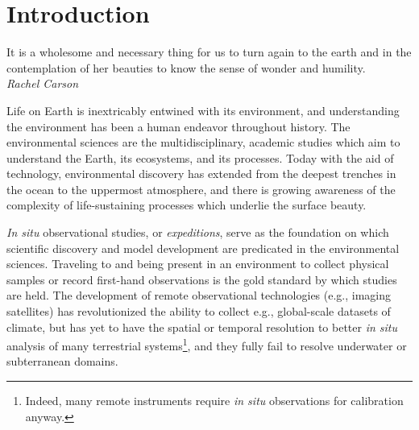 \chapter{Introduction}

\begin{center}
    \begin{minipage}{0.5\textwidth}
      \begin{small}
       It is a wholesome and necessary thing for us to turn again to the earth and in the contemplation of her beauties to know the sense of wonder and humility.\\ \emph{Rachel Carson}
      \end{small}
    \end{minipage}
    \vspace{0.5cm}
\end{center}





Life on Earth is inextricably entwined with its environment, and understanding the environment has been a human endeavor throughout history.
The environmental sciences are the multidisciplinary, academic studies which aim to understand the Earth, its ecosystems, and its processes.
Today with the aid of technology, environmental discovery has extended from the deepest trenches in the ocean to the uppermost atmosphere, and there is growing awareness of the complexity of life-sustaining processes which underlie the surface beauty. 

\emph{In situ} observational studies, or \emph{expeditions}, serve as the foundation on which scientific discovery and model development are predicated in the environmental sciences.
Traveling to and being present in an environment to collect physical samples or record first-hand observations is the gold standard by which studies are held.
The development of remote observational technologies (e.g., imaging satellites) has revolutionized the ability to collect e.g., global-scale datasets of climate, but has yet to have the spatial or temporal resolution to better \emph{in situ} analysis of many terrestrial systems\footnote{Indeed, many remote instruments require \emph{in situ} observations for calibration anyway.}, and they fully fail to resolve underwater or subterranean domains. 

